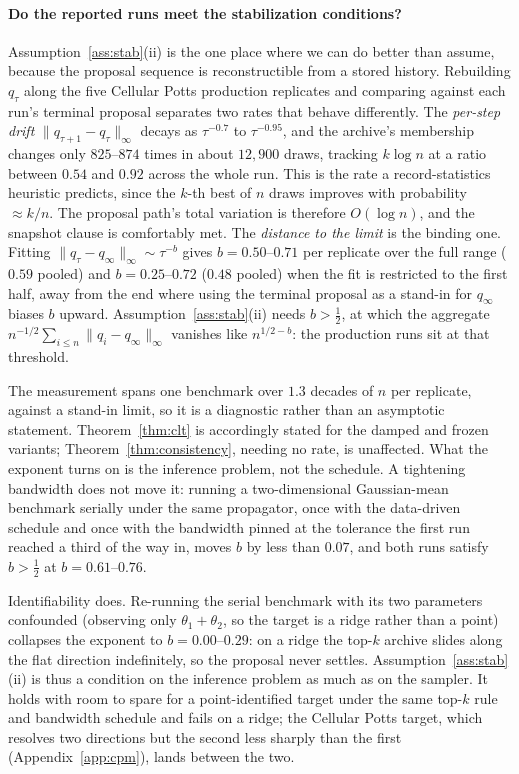 \documentclass[pdflatex,sn-mathphys-num]{sn-jnl}
\theoremstyle{plain}
\theoremstyle{definition}
\begin{document}
\begin{appendices}
\paragraph{Do the reported runs meet the stabilization conditions?} Assumption~\ref{ass:stab}(ii) is the one place where we can do better than assume, because the proposal sequence is reconstructible from a stored history. Rebuilding $q_\tau$ along the five Cellular Potts production replicates and comparing against each run's terminal proposal separates two rates that behave differently. The \emph{per-step drift} $\|q_{\tau+1}-q_\tau\|_\infty$ decays as $\tau^{-0.7}$ to $\tau^{-0.95}$, and the archive's membership changes only $825$--$874$ times in about $12{,}900$ draws, tracking $k\log n$ at a ratio between $0.54$ and $0.92$ across the whole run. This is the rate a record-statistics heuristic predicts, since the $k$-th best of $n$ draws improves with probability ${\approx}k/n$. The proposal path's total variation is therefore $O(\log n)$, and the snapshot clause is comfortably met. The \emph{distance to the limit} is the binding one. Fitting $\|q_\tau-q_\infty\|_\infty\sim\tau^{-b}$ gives $b=0.50$--$0.71$ per replicate over the full range ($0.59$ pooled) and $b=0.25$--$0.72$ ($0.48$ pooled) when the fit is restricted to the first half, away from the end where using the terminal proposal as a stand-in for $q_\infty$ biases $b$ upward. Assumption~\ref{ass:stab}(ii) needs $b>\tfrac12$, at which the aggregate $n^{-1/2}\sum_{i\le n}\|q_i-q_\infty\|_\infty$ vanishes like $n^{1/2-b}$: the production runs sit at that threshold.

The measurement spans one benchmark over $1.3$ decades of $n$ per replicate, against a stand-in limit, so it is a diagnostic rather than an asymptotic statement. Theorem~\ref{thm:clt} is accordingly stated for the damped and frozen variants; Theorem~\ref{thm:consistency}, needing no rate, is unaffected. What the exponent turns on is the inference problem, not the schedule. A tightening bandwidth does not move it: running a two-dimensional Gaussian-mean benchmark serially under the same propagator, once with the data-driven schedule and once with the bandwidth pinned at the tolerance the first run reached a third of the way in, moves $b$ by less than $0.07$, and both runs satisfy $b>\tfrac12$ at $b=0.61$--$0.76$.

Identifiability does. Re-running the serial benchmark with its two parameters confounded (observing only $\theta_1+\theta_2$, so the target is a ridge rather than a point) collapses the exponent to $b=0.00$--$0.29$: on a ridge the top-$k$ archive slides along the flat direction indefinitely, so the proposal never settles. Assumption~\ref{ass:stab}(ii) is thus a condition on the inference problem as much as on the sampler. It holds with room to spare for a point-identified target under the same top-$k$ rule and bandwidth schedule and fails on a ridge; the Cellular Potts target, which resolves two directions but the second less sharply than the first (Appendix~\ref{app:cpm}), lands between the two.


\end{appendices}
\end{document}
